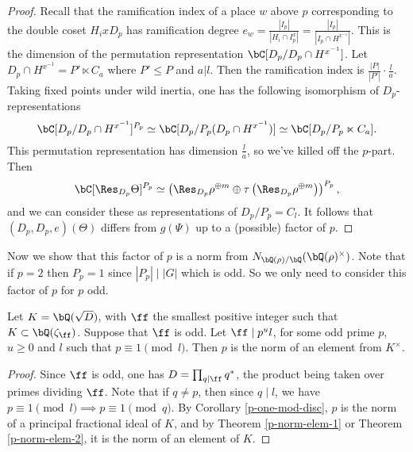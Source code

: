 \begin{proof}
Recall that the ramification index of a place $w$ above $p$ corresponding to the double coset $H_i x D_p$ has ramification degree $e_w = \frac{|I_p|}{|H_i \cap I_p^x|} =\frac{|I_p|}{|I_p \cap H^{x^{-1}}|}$.
This is the dimension of the permutation representation $\bC[D_p / D_p \cap H^{x^{-1}}]$.
Let  $D_p \cap H^{x^{-1}} = P' \ltimes C_a$ where $P' \leq P$ and $a | l$. Then the ramification index is $\frac{|P|}{|P'|}\cdot \frac{l}{a}$. 
Taking fixed points under wild inertia, one has the following isomorphism of $D_p$-representations  $$\bC[D_p / D_p \cap H^{x^{-1}}]^{P_p} \simeq \bC[D_p / P_p (D_p \cap H^{x^{-1}})] \simeq \bC[D_p / P_p \ltimes C_a].$$ This permutation representation has dimension $\frac{l}{a}$, so we've killed off the $p$-part. 
Then $$\bC[\Res_{D_p} \Theta]^{P_p} \simeq \left(\Res_{D_p} \rho^{\oplus m} \oplus \tau\left(\Res_{D_p}\rho^{\oplus m}\right)\right)^{P_p},$$
and we can consider these as representations of $D_p / P_p = C_l$.
It follows that $(D_p, D_p, e)(\Theta)$ differs from $g(\Psi)$ up to a (possible) factor of $p$. 
\end{proof}

Now we show that this factor of $p$ is a norm from $\fieldnorm{\rho}$.
Note that if $p = 2$ then $P_p = 1$ since $|P_p| \mid |G|$ which is odd. So we only need to consider this factor of $p$ for $p$ odd.

\begin{lemma}\label{p-norm-odd}
    Let $K = \bQ(\sqrt{D})$, with $\ff$ the smallest positive integer such that $K \subset \bQ(\zeta_{\ff})$. Suppose that $\ff$ is odd. Let $\ff \mid p^u l $, for some odd prime $p$, $u \geq 0$ and $l$ such that $p \equiv 1 \pmod l$. Then $p$ is the norm of an element from $K^{\times}$.
\end{lemma}

\begin{proof}
    Since $\ff$ is odd, one has $D = \prod_{q | \ff} q^*$, the product being taken over primes dividing $\ff$. Note that if $q \not= p$, then since $q \mid l$, we have $p \equiv 1 \pmod l \implies p \equiv 1 \pmod q$. By Corollary \ref{p-one-mod-disc},  $p$ is the norm of a principal fractional ideal of $K$, and by Theorem \ref{p-norm-elem-1} or Theorem \ref{p-norm-elem-2}, it is the norm of an element of $K$.
\end{proof}

